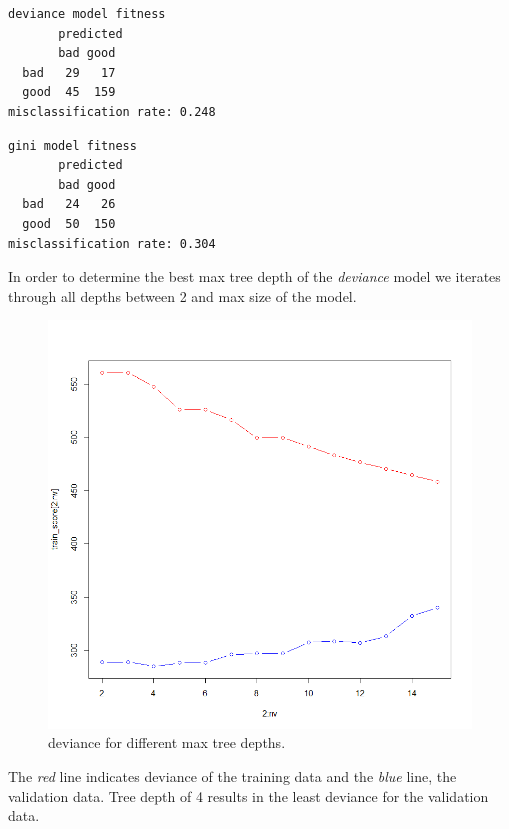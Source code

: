 \documentclass[a4paper,12pt]{article}
\begin{document}
\bigskip

\begin{minipage}[]{0.49\textwidth}
\centering
 \begin{verbatim}
deviance model fitness
       predicted
       bad good
  bad   29   17
  good  45  159
misclassification rate: 0.248
\end{verbatim}
 \end{minipage}
 \begin{minipage}[]{0.49\textwidth}
\begin{verbatim}
gini model fitness
       predicted
       bad good
  bad   24   26
  good  50  150
misclassification rate: 0.304
\end{verbatim}
 \end{minipage}

\bigskip
In order to determine the best max tree depth of the \textit{deviance} model we iterates through all depths between 2 and max size of the model.
\begin{figure}[H]
\centering
\begin{minipage}[]{0.5\textwidth}
  \includegraphics[width=\textwidth]{figures/tree_depth.png}  
  \caption{deviance for different max tree depths.\label{fig:logit_plot}}
 \end{minipage}
\end{figure}
The \textit{red} line indicates deviance of the training data and the \textit{blue} line, the validation data. Tree depth of 4 results in the least deviance for the validation data.
\end{document}
